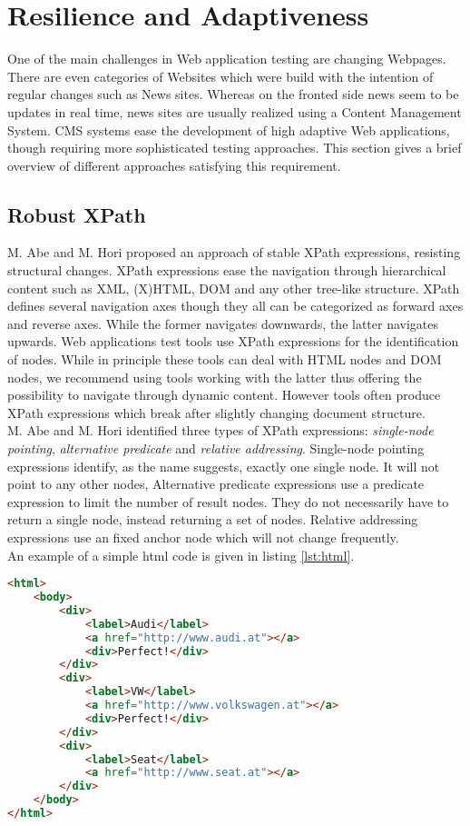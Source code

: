 \documentclass[12pt, notitlepage]{article}
\begin{document}
\section{Resilience and Adaptiveness}
One of the main challenges in Web application testing are changing Webpages. There are even categories of Websites which were build with the intention of regular
changes such as News sites. Whereas on the fronted side news seem to be updates in real time, news sites are usually realized using a Content Management System. 
CMS systems ease the development of high adaptive Web applications, though requiring more sophisticated testing approaches. This section gives a brief overview 
of different approaches satisfying this requirement. 
\subsection{Robust XPath}
M. Abe and M. Hori proposed an approach\cite{robust-xpath} of stable XPath\cite{xpath} expressions, resisting structural changes.
XPath expressions ease the navigation through hierarchical content such as XML\cite{xml}, (X)HTML\cite{html}, DOM\cite{dom} and any other tree-like structure.
XPath defines several navigation axes though they all can be categorized as forward axes and reverse axes. While the former navigates downwards,
the latter navigates upwards. Web applications test tools use XPath expressions for the identification of nodes. While in principle these tools can deal with HTML
nodes and DOM nodes, we recommend using tools working with the latter thus offering the possibility to navigate through dynamic content. 
However tools often produce XPath expressions which break after slightly changing document structure. \\
M. Abe and M. Hori identified three types of XPath expressions: \textit{single-node pointing}, \textit{alternative predicate} and \textit{relative addressing}. 
Single-node pointing expressions identify, as the name suggests, exactly one single node. It will not point to any other nodes, Alternative predicate expressions
use a predicate expression to limit the number of result nodes. They do not necessarily have to return a single node, instead returning a set of nodes.
Relative addressing expressions use an fixed anchor node which will not change frequently.\\
An example of a simple html code is given in listing  \ref{lst:html}.
\begin{lstlisting}[language=HTML, caption={HTML code listing used as source for XPath expressions},label=lst:html]
<html>
	<body>
		<div>
			<label>Audi</label>
			<a href="http://www.audi.at"></a>
			<div>Perfect!</div>
		</div>
		<div>
			<label>VW</label>
			<a href="http://www.volkswagen.at"></a>
			<div>Perfect!</div>
		</div>
		<div>
			<label>Seat</label>
			<a href="http://www.seat.at"></a>
		</div>
	</body>
</html>
\end{lstlisting}
\end{document}
